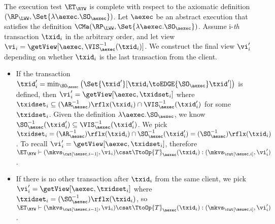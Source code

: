 The execution test $\ET_{\RYW}$ is complete with respect to 
the axiomatic definition $(\RP_{\LWW}, \Set{\lambda \aexec.\SO_{\aexec} })$. 
Let $\aexec$ be an abstract execution that satisfies the definition
$\CMa(\RP_{\LWW}, \Set{\lambda \aexec.\SO_{\aexec} })$.
Assume i-\emph{th} transaction \( \txid_i \) in the arbitrary order,
and let view \( \vi_{i} = \getView[\aexec, \VIS^{-1}_{\aexec}(\txid_{i})] \).
We construct the final view \( \vi'_i\) depending on whether \( \txid_i \) is the last transaction from the client.
\begin{itemize}
\item If the transaction \( \txid'_i = \min_{\SO_\aexec}\left(\Set{\txid'}[\txid_i \toEDGE{\SO_\aexec} \txid' ] \right) \)  is defined,
then \( \vi'_i = \getView[\aexec, \txidset_i] \) where \( \txidset_i \subseteq (\AR_{\aexec}^{-1})\rflx(\txid_i) \cap \VIS_\aexec^{-1}(\txid'_i) \) for some \( \txidset_i \).
Given the definition \( \lambda \aexec.\SO_{\aexec} \), 
we know \( \SO_\aexec^{-1}(\txid'_i) \subseteq \VIS_\aexec^{-1}(\txid'_i) \).
We pick \( \txidset_i = (\AR_\aexec^{-1})\rflx(\txid_i) \cap \SO_\aexec^{-1}(\txid'_i) = (\SO_\aexec^{-1})\rflx(\txid_i) \).
To recall \( \vi'_i = \getView[\aexec, \txidset_i] \), therefore \( \ET_\RYW \vdash (\mkvs_{\cut[\aexec, i-1]}, \vi_i) \csat \TtoOp{T}_{\aexec}(\txid_{i}) : (\mkvs_{\cut[\aexec, i]}, \vi'_{i}) \).
\item If there is no other transaction after \( \txid_i \) from the same client,
we pick \( \vi'_i = \getView[\aexec, \txidset_i] \) where \( \txidset_i = (\SO_\aexec^{-1})\rflx(\txid_i) \),
so \( \ET_\RYW \vdash (\mkvs_{\cut[\aexec, i-1]}, \vi_i) \csat \TtoOp{T}_{\aexec}(\txid_{i}) : (\mkvs_{\cut[\aexec, i]}, \vi'_{i}) \).
\end{itemize}
